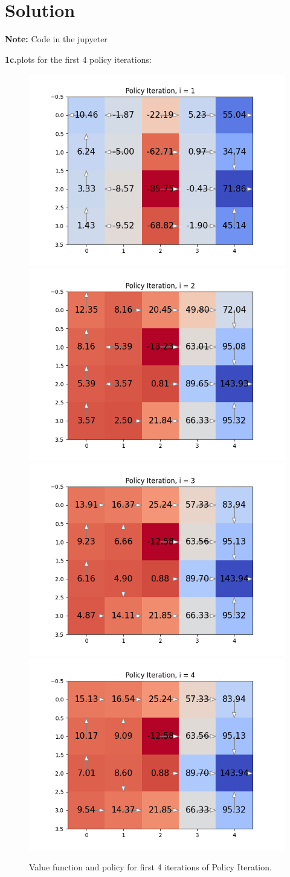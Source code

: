 \documentclass[submit]{../harvardml}
\newenvironment{solution}
  {\color{blue}\section*{Solution}}
{}
\begin{document}
\begin{solution}
\textbf{Note:} Code in the jupyeter

\textbf{1c.}plots for the first 4 policy iterations:

\begin{figure}[h]
    \centering
    \includegraphics[width=0.45\linewidth]{img_output/Policy_1.png}
    \includegraphics[width=0.45\linewidth]{img_output/Policy_2.png}
    \includegraphics[width=0.45\linewidth]{img_output/Policy_3.png}
    \includegraphics[width=0.45\linewidth]{img_output/Policy_4.png}
    \caption{Value function and policy for first 4 iterations of Policy Iteration.}
\end{figure}


\end{solution}
\end{document}
